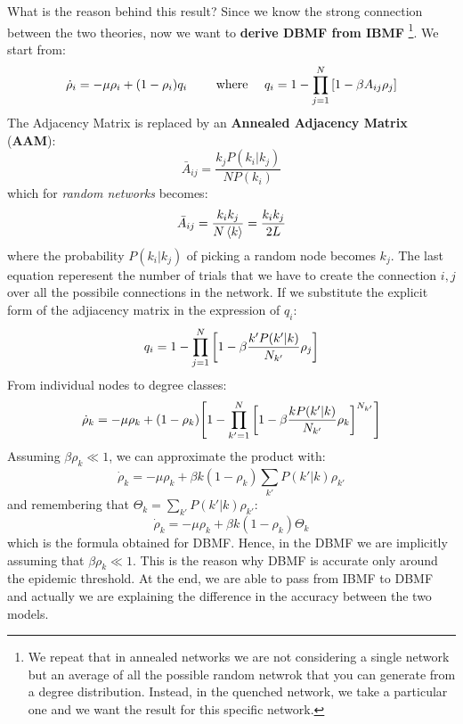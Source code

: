 \documentclass[../main/main.tex]{subfiles}
\begin{document}


What is the reason behind this result? Since we know the strong connection between the two theories, now we want to \textbf{derive DBMF from IBMF}
\footnote{We repeat that in annealed networks we are not considering a single network but an average of all the possible random netwrok that you can generate from a degree distribution. Instead, in the quenched network, we take a particular one and we want the result for this specific network.}.
We start from:
\begin{equation*}
  \dot{\rho }_i = - \mu \rho _i + (1 - \rho _i) q_i \qquad \text{ where } \quad q_i = 1- \prod_{j=1}^{N} \qty[ 1 - \beta A_{ij} \rho _j]
\end{equation*}
The Adjacency Matrix is replaced by an \textbf{Annealed Adjacency Matrix} (\textbf{AAM}):
\begin{equation}
  \bar{A}_{ij} = \frac{k_j P(k_i|k_j)}{N P (k_i)}
\end{equation}
which for \emph{random networks} becomes:
\begin{equation*}
  \bar{A}_{ij} = \frac{k_i k_j}{N \expval{k} } = \frac{k_i k_j}{2 L}
\end{equation*}
where the probability  \(  P(k_i|k_j) \) of picking a random node becomes \( k_j \). The last equation reperesent the number of trials that we have to create the connection \( i,j \) over all the possibile connections in the network.
If we substitute the explicit form of the adjiacency matrix in the expression of \( q_i \):
\begin{equation*}
  q_i = 1 - \prod_{j=1}^{N} \qty[1 - \beta \frac{k' P(k'|k)}{N_{k'}} \rho _j]
\end{equation*}
From individual nodes to degree classes:
\begin{equation*}
  \dot{\rho }_k = - \mu \rho _k + (1- \rho _k) \qty[ 1 - \prod_{k'=1}^{N} \qty[1 - \beta \frac{k P(k'|k)}{N_{k'}} \rho _k]^{N_{k'}} ]
\end{equation*}
Assuming \( \beta \rho _k \ll 1 \), we can approximate the product with:
\begin{equation*}
  \dot{\rho }_k = - \mu \rho _k + \beta k (1 - \rho _k) \sum_{k'}^{} P(k'|k) \rho _{k'}
\end{equation*}
and remembering that \( \Theta _k = \sum_{k'}^{} P(k'|k)\rho _{k'}   \):
\begin{equation*}
  \dot{\rho }_k = - \mu \rho _k + \beta k (1- \rho _k) \Theta _k
\end{equation*}
which is the formula obtained for DBMF. Hence, in the DBMF we are implicitly assuming that  \( \beta \rho _k \ll 1 \). This is the reason why DBMF is accurate only around the epidemic threshold. At the end, we are able to pass from IBMF to DBMF and actually we are explaining the difference in the accuracy between the two models.
\end{document}

